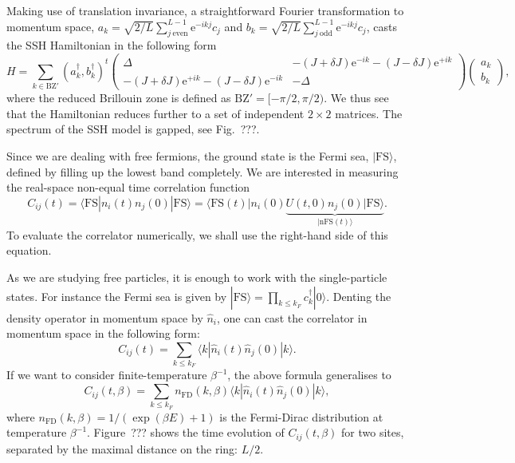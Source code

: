 \documentclass{SciPost}
\newcommand\0{\scalebox{-1}[1]{0}}
\begin{document}
Making use of translation invariance, a straightforward Fourier transformation to momentum space, $a_k = \sqrt{2/L}\sum_{j\ \mathrm{even}}^{L-1} \mathrm e^{-i k j}c_{j}$ and $b_k = \sqrt{2/L}\sum_{j\ \mathrm{odd}}^{L-1}\mathrm e^{-i k j} c_{j}$, casts the SSH Hamiltonian in the following form
\begin{equation}
H \!=\! \sum_{k\in\mathrm{BZ'}} (a^\dagger_k,b^\dagger_k)^t
\left(\begin{array}{cc}
\Delta & -(J+\delta J)\mathrm e^{-i k} - (J-\delta J)\mathrm e^{+i k} \\
-(J+\delta J)\mathrm e^{+i k} - (J-\delta J)\mathrm e^{-i k} & -\Delta
\end{array}
\right)
\left(\! \begin{array}{c}
a_k\\
b_k
\end{array}
\!\right),
\end{equation}
where the reduced Brillouin zone is defined as $\mathrm{BZ'}=[-\pi/2,\pi/2)$. We thus see that the Hamiltonian reduces further to a set of independent $2\times 2$ matrices. The spectrum of the SSH model is gapped, see Fig.~???.

Since we are dealing with free fermions, the ground state is the Fermi sea, $|\mathrm{FS}\rangle$, defined by filling up the lowest band completely. We are interested in measuring the real-space non-equal time correlation function
\begin{equation}
\label{eq:SSH_corr}
C_{ij}(t) = \langle \mathrm{FS}|n_i(t)n_j(0)|\mathrm{FS}\rangle = \langle \mathrm{FS}(t)|n_i(0)\underbrace{U(t,0)n_j(0)|\mathrm{FS}\rangle}_{|\mathrm{nFS}(t)\rangle}.
\end{equation}
To evaluate the correlator numerically, we shall use the right-hand side of this equation.

As we are studying free particles, it is enough to work with the single-particle states. For instance the Fermi sea is given by $|\mathrm{FS}\rangle = \prod_{k\leq k_F}c^\dagger_k|0\rangle$. Denting the density operator in momentum space by $\hat n_{i}$, one can cast the correlator in momentum space in the following form:
\begin{equation}
C_{ij}(t) = \sum_{k\leq k_F}\langle k|\hat n_i(t)\hat n_j(0)|k\rangle.
\end{equation}
If we want to consider finite-temperature $\beta^{-1}$, the above formula generalises to
\begin{equation}
C_{ij}(t,\beta) = \sum_{k\leq k_F}n_\mathrm{FD}(k,\beta)\langle k|\hat n_i(t)\hat n_j(0)|k\rangle,
\end{equation} 
where $n_\mathrm{FD}(k,\beta) = 1/(\exp(\beta E)+1)$ is the Fermi-Dirac distribution at temperature $\beta^{-1}$. Figure~??? shows the time evolution of $C_{ij}(t,\beta)$ for two sites, separated by the maximal distance on the ring: $L/2$. 
\end{document}
